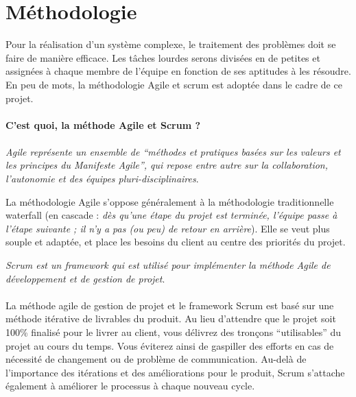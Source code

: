        
        \section{Méthodologie}
        Pour la réalisation d'un système complexe, le traitement des problèmes doit se faire 
        de manière efficace. Les tâches lourdes serons divisées en de petites et assignées 
        à chaque membre de l'équipe  en fonction de ses aptitudes à les résoudre. En peu de mots,
        la méthodologie Agile et scrum est adoptée dans le cadre de ce projet.

        
        \paragraph{C’est quoi, la méthode Agile et Scrum ?}
        \paragraph{}
        \textit{Agile représente un ensemble de “méthodes et pratiques basées sur 
        les valeurs et les principes du Manifeste Agile”, qui repose entre autre sur 
        la collaboration, l’autonomie et des équipes pluri-disciplinaires}\cite{Littlefield2017}.
        \par
        La méthodologie Agile s'oppose généralement à la méthodologie traditionnelle waterfall (en cascade :
        \textit{dès qu'une étape du projet est terminée, l'équipe passe à l'étape suivante ; il n'y a pas (ou peu) 
        de retour en arrière}\cite{david2017}). Elle se veut plus souple 
        et adaptée, et place les besoins du client au centre des priorités du projet.
        \par
        \textit{Scrum est un framework qui est utilisé pour implémenter la méthode 
        Agile de développement et de gestion de projet}\cite{Littlefield2017}.

        \paragraph{}
        La méthode agile de gestion de projet et le framework Scrum est basé sur une méthode 
        itérative de livrables du produit. Au lieu d’attendre que le projet soit 100\% finalisé 
        pour le livrer au client, vous délivrez des tronçons “utilisables” du projet au cours du 
        temps. Vous éviterez ainsi de gaspiller des efforts en cas de nécessité de changement ou 
        de problème de communication. Au-delà de l’importance des itérations et des améliorations 
        pour le produit, Scrum s’attache également à améliorer le processus à chaque nouveau cycle.
